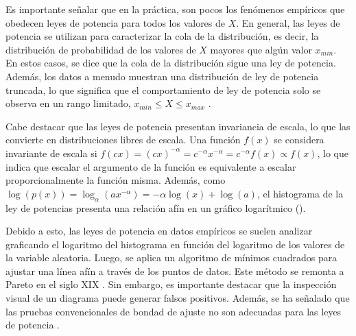 Es importante señalar que en la práctica, son pocos los fenómenos empíricos que obedecen leyes de potencia para todos los valores de $X$. En general, las leyes de potencia se utilizan para caracterizar la cola de la distribución, es decir, la distribución de probabilidad de los valores de $X$ mayores que algún valor $x_{min}$. En estos casos, se dice que la cola de la distribución sigue una ley de potencia. Además, los datos a menudo muestran una distribución de ley de potencia truncada, lo que significa que el comportamiento de ley de potencia solo se observa en un rango limitado, $x_{min}\leq X \leq x_{max}$  \cite{touboul_can_2010}.

Cabe destacar que las leyes de potencia presentan invariancia de escala, lo que las convierte en distribuciones libres de escala. Una función $f(x)$ se considera invariante de escala si $ f(cx)  = \left(cx\right)^{-\alpha}=c^{-\alpha}x^{-\alpha}=c^{-\alpha}f(x)\propto f(x)$, lo que indica que escalar el argumento de la función es equivalente a escalar proporcionalmente la función misma. Además, como $\log(p(x))=\log_{\alpha}\left(ax^{-\alpha}\right) = -\alpha\log(x)+\log(a)$, el histograma de la ley de potencias presenta una relación afín en un gráfico logarítmico ().

Debido a esto, las leyes de potencia en datos empíricos se suelen analizar graficando el logaritmo del histograma en función del logaritmo de los valores de la variable aleatoria. Luego, se aplica un algoritmo de mínimos cuadrados para ajustar una línea afín a través de los puntos de datos. Este método se remonta a Pareto en el siglo XIX \cite{arnold_pareto_2008}. Sin embargo, es importante destacar que la inspección visual de un diagrama puede generar falsos positivos. Además, se ha señalado que las pruebas convencionales de bondad de ajuste no son adecuadas para las leyes de potencia \cite{newman_power_2005}.



